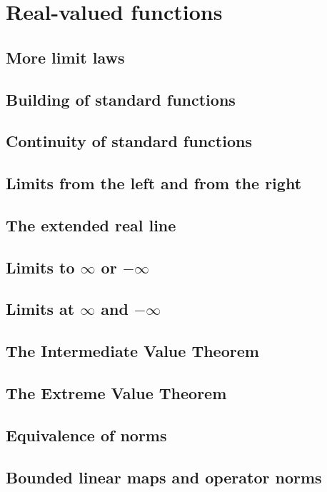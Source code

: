 \section{Real-valued functions}

\subsection{More limit laws}

\subsection{Building of standard functions}

\subsection{Continuity of standard functions}

\subsection{Limits from the left and from the right}

\subsection{The extended real line}

\subsection{Limits to $\infty$ or $-\infty$}

\subsection{Limits at $\infty$ and $-\infty$}

\subsection{The Intermediate Value Theorem}

\subsection{The Extreme Value Theorem}

\subsection{Equivalence of norms}

\subsection{Bounded linear maps and operator norms}
